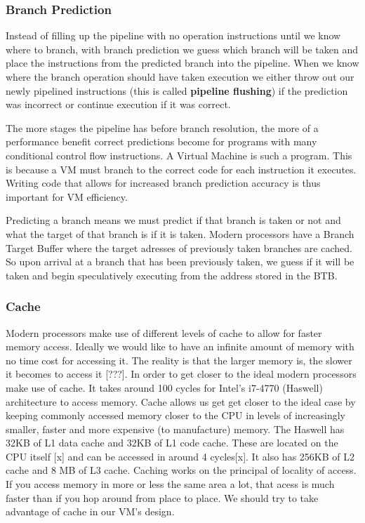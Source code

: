 \documentclass[english,a4paper]{article}
\begin{document}
\subsubsection{Branch Prediction}

Instead of filling up the pipeline with no operation instructions
until we know where to branch, with branch prediction we guess which
branch will be taken and place the instructions from the predicted
branch into the pipeline. When we know where the branch operation
should have taken execution we either throw out our newly pipelined
instructions (this is called \textbf{pipeline flushing}) if the
prediction was incorrect or continue execution if it was correct.

The more stages the pipeline has before branch resolution, the more of
a performance benefit correct predictions become for programs with
many conditional control flow instructions. A Virtual Machine is such
a program. This is because a VM must branch to the correct code for
each instruction it executes. Writing code that allows for increased
branch prediction accuracy is thus important for VM efficiency.

Predicting a branch means we must predict if that branch is taken or
not and what the target of that branch is if it is taken. Modern
processors have a Branch Target Buffer where the target adresses of
previously taken branches are cached. So upon arrival at a branch that
has been previously taken, we guess if it will be taken and begin
speculatively executing from the address stored in the BTB.

\subsubsection{Cache}

Modern processors make use of different levels of cache to allow for
faster memory access. Ideally we would like to have an infinite amount
of memory with no time cost for accessing it. The reality is that the
larger memory is, the slower it becomes to access it {[}???{]}. In
order to get closer to the ideal modern processors make use of
cache. It takes around 100 cycles for Intel's i7-4770 (Haswell)
architecture to access memory. Cache allows us get get closer to the
ideal case by keeping commonly accessed memory closer to the CPU in
levels of increasingly smaller, faster and more expensive (to
manufacture) memory. The Haswell has 32KB of L1 data cache and 32KB of
L1 code cache. These are located on the CPU itself {[}x{]} and can be
accessed in around 4 cycles{[}x{]}. It also has 256KB of L2 cache and
8 MB of L3 cache. Caching works on the principal of locality of
access. If you access memory in more or less the same area a lot, that
acess is much faster than if you hop around from place to place. We
should try to take advantage of cache in our VM's design.
\end{document}
